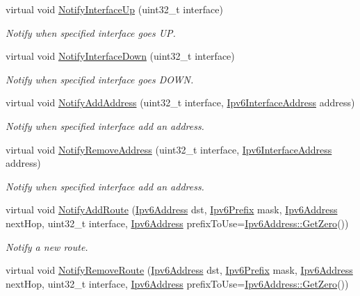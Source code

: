 \begin{DoxyCompactItemize}
virtual void \hyperlink{classns3_1_1RipNg_a588e191ae91316e498a8e5c84a9c77fb}{Notify\+Interface\+Up} (uint32\+\_\+t interface)
\begin{DoxyCompactList}\small\item\em Notify when specified interface goes UP. \end{DoxyCompactList}\item 
virtual void \hyperlink{classns3_1_1RipNg_a2031124814e8d817d0a40dddb7327a1b}{Notify\+Interface\+Down} (uint32\+\_\+t interface)
\begin{DoxyCompactList}\small\item\em Notify when specified interface goes D\+O\+WN. \end{DoxyCompactList}\item 
virtual void \hyperlink{classns3_1_1RipNg_a9d6ffbffc76b029e5dfc9f394549d670}{Notify\+Add\+Address} (uint32\+\_\+t interface, \hyperlink{classns3_1_1Ipv6InterfaceAddress}{Ipv6\+Interface\+Address} address)
\begin{DoxyCompactList}\small\item\em Notify when specified interface add an address. \end{DoxyCompactList}\item 
virtual void \hyperlink{classns3_1_1RipNg_a0658ff312aa09265ddc9ad8718789f0a}{Notify\+Remove\+Address} (uint32\+\_\+t interface, \hyperlink{classns3_1_1Ipv6InterfaceAddress}{Ipv6\+Interface\+Address} address)
\begin{DoxyCompactList}\small\item\em Notify when specified interface add an address. \end{DoxyCompactList}\item 
virtual void \hyperlink{classns3_1_1RipNg_a57bee3de4b39e03ad66e3fd35abf4805}{Notify\+Add\+Route} (\hyperlink{classns3_1_1Ipv6Address}{Ipv6\+Address} dst, \hyperlink{classns3_1_1Ipv6Prefix}{Ipv6\+Prefix} mask, \hyperlink{classns3_1_1Ipv6Address}{Ipv6\+Address} next\+Hop, uint32\+\_\+t interface, \hyperlink{classns3_1_1Ipv6Address}{Ipv6\+Address} prefix\+To\+Use=\hyperlink{classns3_1_1Ipv6Address_a63a34bdb1505e05fbdd07d316d0bd7e6}{Ipv6\+Address\+::\+Get\+Zero}())
\begin{DoxyCompactList}\small\item\em Notify a new route. \end{DoxyCompactList}\item 
virtual void \hyperlink{classns3_1_1RipNg_a72de5c5fbbe3bd7f29a5b05d3dd46c16}{Notify\+Remove\+Route} (\hyperlink{classns3_1_1Ipv6Address}{Ipv6\+Address} dst, \hyperlink{classns3_1_1Ipv6Prefix}{Ipv6\+Prefix} mask, \hyperlink{classns3_1_1Ipv6Address}{Ipv6\+Address} next\+Hop, uint32\+\_\+t interface, \hyperlink{classns3_1_1Ipv6Address}{Ipv6\+Address} prefix\+To\+Use=\hyperlink{classns3_1_1Ipv6Address_a63a34bdb1505e05fbdd07d316d0bd7e6}{Ipv6\+Address\+::\+Get\+Zero}())

\end{DoxyCompactItemize}
